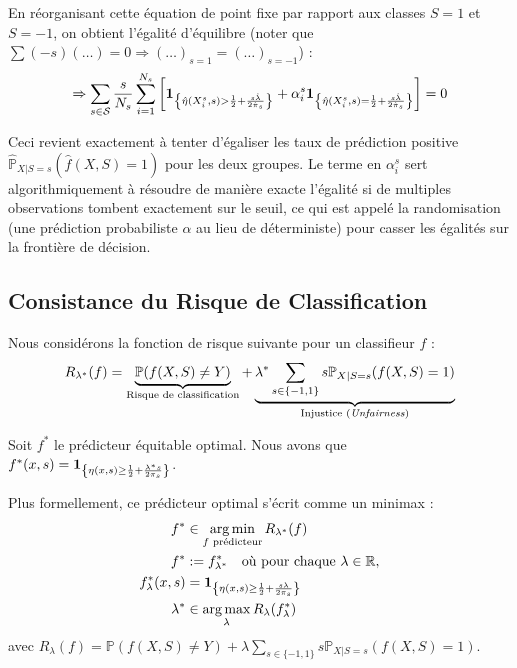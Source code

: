 En réorganisant cette équation de point fixe par rapport aux classes $S=1$ et $S=-1$, on obtient l'égalité d'équilibre (noter que $\sum (-s)(\dots) = 0 \Rightarrow (\dots)_{s=1} = (\dots)_{s=-1}$) :
\begin{equation}
    \Rightarrow \sum_{s \in \mathcal{S}} \frac{s}{N_s} \sum_{i=1}^{N_s} \left[ \mathbf{1}_{\left\{ \hat{\eta}(X_i^s, s) > \frac{1}{2} + \frac{s\hat{\lambda}}{2\hat{\pi}_s} \right\}} + \alpha_i^s \mathbf{1}_{\left\{ \hat{\eta}(X_i^s, s) = \frac{1}{2} + \frac{s\hat{\lambda}}{2\hat{\pi}_s} \right\}} \right] = 0
\end{equation}

Ceci revient exactement à tenter d'égaliser les taux de prédiction positive $\hat{\mathbb{P}}_{X|S=s}(\hat{f}(X, S)=1)$ pour les deux groupes. Le terme en $\alpha_i^s$ sert algorithmiquement à résoudre de manière exacte l'égalité si de multiples observations tombent exactement sur le seuil, ce qui est appelé la randomisation (une prédiction probabiliste $\alpha$ au lieu de déterministe) pour casser les égalités sur la frontière de décision.

\subsection{Consistance du Risque de Classification}

Nous considérons la fonction de risque suivante pour un classifieur $f$ :
\begin{equation}
    R_{\lambda^*}(f) = \underbrace{\mathbb{P}(f(X, S) \neq Y)}_{\text{Risque de classification}} + \underbrace{\lambda^* \sum_{s \in \{-1, 1\}} s \mathbb{P}_{X|S=s}(f(X, S) = 1)}_{\text{Injustice (\textit{Unfairness})}}
\end{equation}

Soit $f^*$ le prédicteur équitable optimal.
Nous avons que $f^*(x, s) = \mathbf{1}_{\left\{ \eta(x, s) \ge \frac{1}{2} + \frac{\lambda^* s}{2\pi_s} \right\}}$.

Plus formellement, ce prédicteur optimal s'écrit comme un minimax :
\begin{align}
    f^* &\in \operatorname*{arg\,min}_{f \text{ prédicteur}} R_{\lambda^*}(f) \nonumber \\
    f^* &:= f^*_{\lambda^*} \quad \text{où pour chaque } \lambda \in \mathbb{R},  \nonumber \\
    f^*_\lambda(x, s) &= \mathbf{1}_{\left\{ \eta(x, s) \ge \frac{1}{2} + \frac{s\lambda}{2\pi_s} \right\}} \\
    \lambda^* &\in \operatorname*{arg\,max}_{\lambda} R_\lambda(f^*_\lambda) \nonumber
\end{align}
avec $R_\lambda(f) = \mathbb{P}(f(X, S) \neq Y) + \lambda \sum_{s \in \{-1, 1\}} s \mathbb{P}_{X|S=s}(f(X, S) = 1)$.

